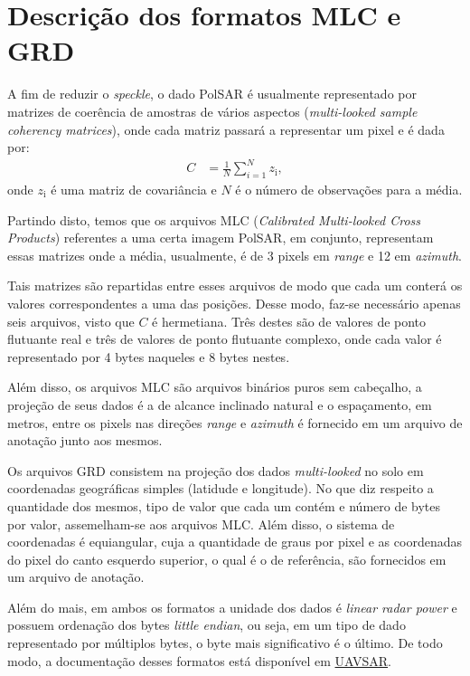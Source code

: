 \documentclass[12pt]{article}
\begin{document}
\section{Descrição dos formatos MLC e GRD}

A fim de reduzir o \textit{speckle}\cite{Deng17}, o dado PolSAR é usualmente representado por matrizes de coerência de amostras de vários aspectos (\textit{multi-looked sample coherency matrices}), onde cada matriz passará a representar um pixel e é dada por:
\begin{align*}
C &= \frac{1}{N}\sum_{i = 1}^{N} z_\text{i},
\end{align*}
onde $z_\text{i}$ é uma matriz de covariância e $N$ é o número de observações para a média.

Partindo disto, temos que os arquivos MLC (\textit{Calibrated Multi-looked Cross Products}) referentes a uma certa imagem PolSAR, em conjunto, representam essas matrizes onde a média, usualmente, é de 3 pixels em \textit{range} e 12 em \textit{azimuth}. 

Tais matrizes são repartidas entre esses arquivos de modo que cada um conterá os valores correspondentes a uma das posições. Desse modo, faz-se necessário apenas seis arquivos, visto que $C$ é hermetiana. Três destes são de valores de ponto flutuante real e três de valores de ponto flutuante complexo, onde cada valor é representado por 4 bytes naqueles e 8 bytes nestes.

Além disso, os arquivos MLC são arquivos binários puros sem cabeçalho, a projeção de seus dados é a de alcance inclinado natural e o espaçamento, em metros, entre os pixels nas direções \textit{range} e \textit{azimuth} é fornecido em um arquivo de anotação junto aos mesmos.

Os arquivos GRD consistem na projeção dos dados \textit{multi-looked} no solo em coordenadas geográficas simples (latidude e longitude). No que diz respeito a quantidade dos mesmos, tipo de valor que cada um contém e número de bytes por valor, assemelham-se aos arquivos MLC. Além disso, o sistema de coordenadas é equiangular, cuja a quantidade de graus por pixel e as coordenadas do pixel do canto esquerdo superior, o qual é o de referência, são fornecidos em um arquivo de anotação.

Além do mais, em ambos os formatos a unidade dos dados é \textit{linear radar power} e possuem ordenação dos bytes \textit{little endian}, ou seja, em um tipo de dado representado por múltiplos bytes, o byte mais significativo é o último. De todo modo, a documentação desses formatos está disponível em \href{https://uavsar.jpl.nasa.gov/science/documents/polsar-format.html}{UAVSAR}.
\end{document}
